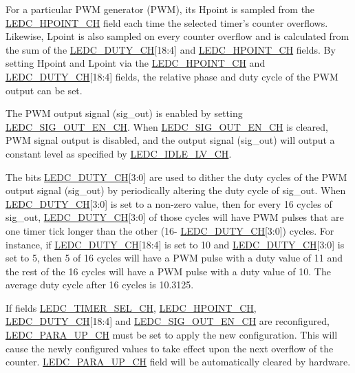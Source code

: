 \documentclass[main\_\_EN.tex]{subfiles}
\begin{document}
For a particular PWM generator (PWM), its Hpoint is sampled from the \hyperref[fielddesc:LEDCHPOINTCHN]{LEDC\_HPOINT\_CH} field each time the selected timer's counter overflows. Likewise, Lpoint is also sampled on every counter overflow and is calculated from the sum of the \hyperref[fielddesc:LEDCDUTYCHN]{LEDC\_DUTY\_CH}[18:4] and \hyperref[fielddesc:LEDCHPOINTCHN]{LEDC\_HPOINT\_CH} fields. By setting Hpoint and Lpoint via the \hyperref[fielddesc:LEDCHPOINTCHN]{LEDC\_HPOINT\_CH} and \hyperref[fielddesc:LEDCDUTYCHN]{LEDC\_DUTY\_CH}[18:4] fields, the relative phase and duty cycle of the PWM output can be set.

The PWM output signal (sig\_out) is enabled by setting \hyperref[fielddesc:LEDCSIGOUTENCHN]{LEDC\_SIG\_OUT\_EN\_CH}. When \hyperref[fielddesc:LEDCSIGOUTENCHN]{LEDC\_SIG\_OUT\_EN\_CH} is cleared, PWM signal output is disabled, and the output signal (sig\_out) will output a constant level as specified by \hyperref[fielddesc:LEDCIDLELVCHN]{LEDC\_IDLE\_LV\_CH}.

The bits \hyperref[fielddesc:LEDCDUTYCHN]{LEDC\_DUTY\_CH}[3:0] are used to dither the duty cycles of the PWM output signal (sig\_out) by periodically altering the duty cycle of sig\_out. When \hyperref[fielddesc:LEDCDUTYCHN]{LEDC\_DUTY\_CH}[3:0] is set to a non-zero value, then for every 16 cycles of sig\_out, \hyperref[fielddesc:LEDCDUTYCHN]{LEDC\_DUTY\_CH}[3:0] of those cycles will have PWM pulses that are one timer tick longer than the other (16- \hyperref[fielddesc:LEDCDUTYCHN]{LEDC\_DUTY\_CH}[3:0]) cycles. For instance, if \hyperref[fielddesc:LEDCDUTYCHN]{LEDC\_DUTY\_CH}[18:4] is set to 10 and \hyperref[fielddesc:LEDCDUTYCHN]{LEDC\_DUTY\_CH}[3:0] is set to 5, then 5 of 16 cycles will have a PWM pulse with a duty value of 11 and the rest of the 16 cycles will have a PWM pulse with a duty value of 10. The average duty cycle after 16 cycles is 10.3125.

If fields \hyperref[fielddesc:LEDCTIMERSELCHN]{LEDC\_TIMER\_SEL\_CH},
\hyperref[fielddesc:LEDCHPOINTCHN]{LEDC\_HPOINT\_CH}, \hyperref[fielddesc:LEDCDUTYCHN]{LEDC\_DUTY\_CH}[18:4] and  \hyperref[fielddesc:LEDCSIGOUTENCHN]{LEDC\_SIG\_OUT\_EN\_CH} are reconfigured, \hyperref[fielddesc:LEDCPARAUPCHN]{LEDC\_PARA\_UP\_CH} must be set to apply the new configuration. This will cause the newly configured values to take effect upon the next overflow of the counter. \hyperref[fielddesc:LEDCPARAUPCHN]{LEDC\_PARA\_UP\_CH} field will be automatically cleared by hardware.
\end{document}
